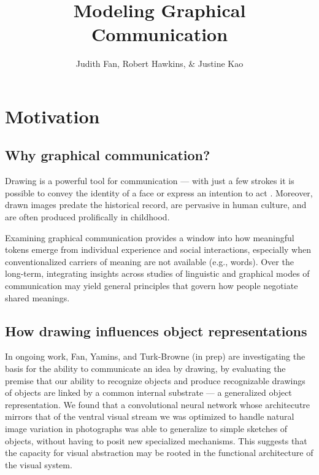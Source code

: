 \documentclass[12pt]{article}
\title{\textbf{Modeling Graphical Communication}}
\author{Judith Fan, Robert Hawkins, \& Justine Kao}
\begin{document}
\maketitle %

\section{Motivation}

\subsection{Why graphical communication?}

Drawing is a powerful tool for communication --- with just a few strokes it is possible to convey the identity of a face \cite{bergmann2013impact} or express an intention to act \cite{Galantucci:2005uh}. Moreover, drawn images predate the historical record, are pervasive in human culture, and are often produced prolifically in childhood.

Examining graphical communication provides a window into how meaningful tokens emerge from individual experience and social interactions, especially when conventionalized carriers of meaning are not available (e.g., words). Over the long-term, integrating insights across studies of linguistic and graphical modes of communication may yield general principles that govern how people negotiate shared meanings.  

\subsection{How drawing influences object representations}

In ongoing work, Fan, Yamins, and Turk-Browne (in prep) are investigating the basis for the ability to communicate an idea by drawing, by evaluating the premise that our ability to recognize objects and produce recognizable drawings of objects are linked by a common internal substrate --- a generalized object representation. We found that a convolutional neural network whose architecutre mirrors that of the ventral visual stream we was optimized to handle natural image variation in photographs \cite{Yamins:2014gia} was able to generalize to simple sketches of objects, without having to posit new specialized mechanisms. This suggests that the capacity for visual abstraction may be rooted in the functional architecture of the visual system.
\end{document}
